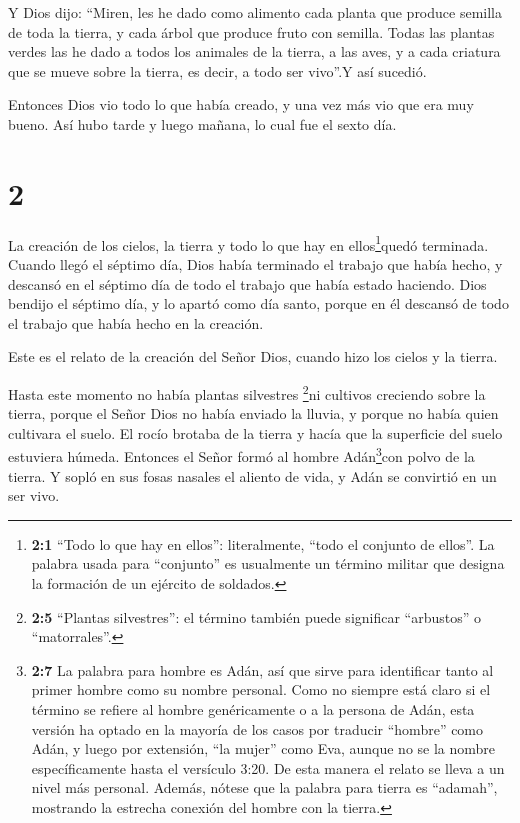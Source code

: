  Y Dios dijo: ``Miren, les he dado como alimento cada
planta que produce semilla de toda la tierra, y cada árbol que produce
fruto con semilla.  Todas las plantas verdes las he dado a
todos los animales de la tierra, a las aves, y a cada criatura que se
mueve sobre la tierra, es decir, a todo ser vivo''.Y así sucedió.

 Entonces Dios vio todo lo que había creado, y una vez más
vio que era muy bueno. Así hubo tarde y luego mañana, lo cual fue el
sexto día.

\hypertarget{section-1}{%
\section{2}\label{section-1}}

 La creación de los cielos, la tierra y todo lo que hay en
ellos\footnote{\textbf{2:1} ``Todo lo que hay en ellos'': literalmente,
  ``todo el conjunto de ellos''. La palabra usada para ``conjunto'' es
  usualmente un término militar que designa la formación de un ejército
  de soldados.}quedó terminada.  Cuando llegó el séptimo
día, Dios había terminado el trabajo que había hecho, y descansó en el
séptimo día de todo el trabajo que había estado haciendo. 
Dios bendijo el séptimo día, y lo apartó como día santo, porque en él
descansó de todo el trabajo que había hecho en la creación.

 Este es el relato de la creación del Señor Dios, cuando
hizo los cielos y la tierra.

 Hasta este momento no había plantas silvestres
\footnote{\textbf{2:5} ``Plantas silvestres'': el término también puede
  significar ``arbustos'' o ``matorrales''.}ni cultivos creciendo sobre
la tierra, porque el Señor Dios no había enviado la lluvia, y porque no
había quien cultivara el suelo.  El rocío brotaba de la
tierra y hacía que la superficie del suelo estuviera húmeda.
 Entonces el Señor formó al hombre Adán\footnote{\textbf{2:7}
  La palabra para hombre es Adán, así que sirve para identificar tanto
  al primer hombre como su nombre personal. Como no siempre está claro
  si el término se refiere al hombre genéricamente o a la persona de
  Adán, esta versión ha optado en la mayoría de los casos por traducir
  ``hombre'' como Adán, y luego por extensión, ``la mujer'' como Eva,
  aunque no se la nombre específicamente hasta el versículo 3:20. De
  esta manera el relato se lleva a un nivel más personal. Además, nótese
  que la palabra para tierra es ``adamah'', mostrando la estrecha
  conexión del hombre con la tierra.}con polvo de la tierra. Y sopló en
sus fosas nasales el aliento de vida, y Adán se convirtió en un ser
vivo.

